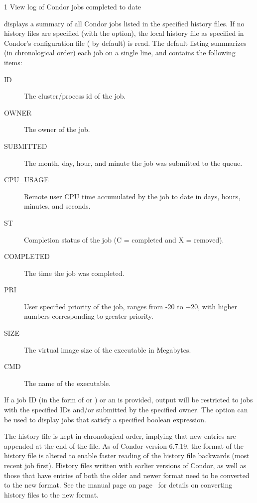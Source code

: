 \begin{ManPage}{\label{man-condor-history}}{1}
{View log of Condor jobs completed to date}
\Synopsis
{}


\Description
{} displays a summary of all Condor jobs listed in the
specified history files.
If no history files are specified (with the  option), the local
history file as specified in Condor's configuration file
( by default) is read.  
The default listing
summarizes (in chronological order)
each job on a single line, and  contains the following items:


\begin{description}
\item[ID] The cluster/process id of the job. 
\item[OWNER] The owner of the job. 
\item[SUBMITTED] The month, day, hour, and minute the job was submitted to the queue. 
\item[CPU\_USAGE] Remote user CPU time accumulated by the job to date in days, hours, minutes, and seconds.
\item[ST] Completion status of the job (C = completed and X = removed).
\item[COMPLETED] The time the job was completed.
\item[PRI] User specified priority of the job, ranges from -20 to +20, with higher numbers corresponding to greater priority. 
\item[SIZE] The virtual image size of the executable in Megabytes. 
\item[CMD] The name of the executable. 
\end{description}

If a job ID (in the form of  or ) or an
 is provided, output will be restricted to jobs with the
specified IDs and/or submitted by the specified owner.  
The  option can be used to display jobs that satisfy a
specified boolean expression.

The history file is kept in chronological order,
implying that new entries are appended at the end of the
file.
As of Condor version 6.7.19,
the format of the history file is altered to enable faster
reading of the history file backwards (most recent job first).
History files written with earlier versions of Condor,
as well as those that have entries of both
the older and newer format
need to be converted to the new format.
See the  manual page 
on page~\pageref{man-condor-convert-history}
for details on converting history files to the new format.


\end{ManPage}
